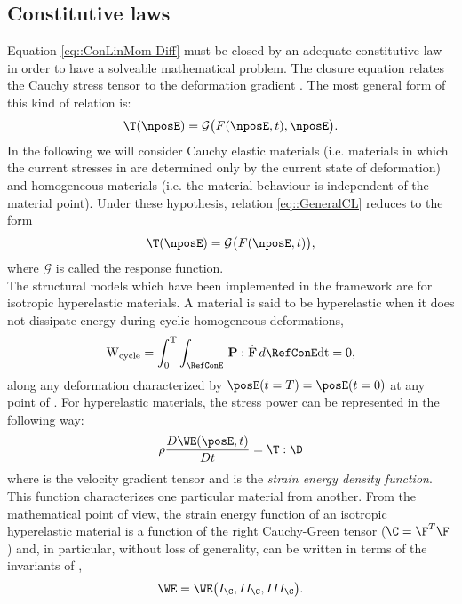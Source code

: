 \subsection{Constitutive laws}
\label{sct-Constitutive}
Equation \eqref{eq::ConLinMom-Diff} must be closed by an adequate constitutive law in order to have a solveable mathematical problem. The closure equation relates the Cauchy stress tensor \T to the deformation gradient \F. The most general form of this kind of relation is:
\begin{equation}
  \T(\nposE)=\mathcal{G}\big(F(\nposE,t),\nposE\big).
  \label{eq::GeneralCL}
\end{equation}
In the following we will consider Cauchy elastic materials (i.e. materials in which the current stresses in \CurCon are determined only by the current state of deformation) and homogeneous materials (i.e. the material behaviour is independent of the material point). Under these hypothesis, relation \eqref{eq::GeneralCL} reduces to the form
\begin{equation}
  \T(\nposE)=\mathcal{G}\big(F(\nposE,t)\big),
  \label{eq::OurRelation}
\end{equation}
where $\mathcal{G}$ is called the response function.\\
The structural models which have been implemented in the \SSol framework are for isotropic hyperelastic materials. A material is said to be hyperelastic when it does not dissipate energy during cyclic homogeneous deformations,
\begin{equation}
   \text{W}_{\text{cycle}} = \int_{0}^{\text{T}}\int_{\RefConE}\,\mathbf{P}:\dot{\mathbf{F}}\,d\RefConE\text{dt}
 = 0,
  \label{eq::energyDiss}
\end{equation}
along any deformation characterized by $\posE(t=T)=\posE(t=0)$ at any point of \RefCon. For hyperelastic materials, the stress power can be represented in the following way:
\begin{equation}
  \rho\frac{D\WE(\posE,t)}{Dt}=\T:\D
  \label{eq::HyperSP}
\end{equation}
where \D is the velocity gradient tensor and \W is the \textit{strain energy density function}. This function characterizes one particular material from another. From the mathematical point of view, the strain energy function of an isotropic hyperelastic material is a function of the right Cauchy-Green tensor ($\C=\F^{T}\F$) and, in particular, without loss of generality, \W can be written in terms of the invariants of \C,
\begin{equation}
  \WE=\WE\big(I_{\C},II_{\C},III_{\C}\big).
  \label{eq::WandInvariants}
\end{equation}
